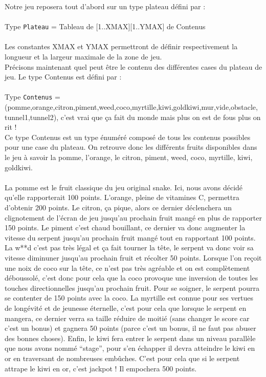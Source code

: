 \documentclass[11pt,a4paper]{article}
\begin{document}
        Notre jeu reposera tout d'abord sur un type plateau défini par : \\\\
        Type \verb|Plateau| = Tableau de [1..XMAX][1..YMAX] de Contenus\\\\
        Les constantes XMAX et YMAX permettront de définir respectivement la longueur et la largeur maximale de la zone de jeu.\\
        
        Précisons maintenant quel peut être le contenu des différentes cases du plateau de jeu. Le type Contenus est défini par : \\\\
        Type \verb|Contenus| = (pomme,orange,citron,piment,weed,coco,myrtille,kiwi,goldkiwi,mur,vide,obstacle,
        tunnel1,tunnel2), c'est vrai que ça fait du monde mais plus on est de fous plus on rit !\\
        
        Ce type Contenus est un type énuméré composé de tous les contenus possibles pour une case du plateau. On retrouve donc les différents fruits disponibles dans le jeu à savoir la pomme, l'orange, le citron, piment, weed, coco, myrtille, kiwi, goldkiwi.\\\\
        La pomme est le fruit classique du jeu original snake. Ici, nous avons décidé qu'elle rapporterait 100 points. L'orange, pleine de vitamines C, permettra d'obtenir 200 points. Le citron, ça pique, alors ce dernier déclenchera un clignotement  de l'écran de jeu jusqu'au prochain fruit mangé en plus de rapporter 150 points. Le piment c'est chaud bouillant, ce dernier va donc augmenter la vitesse du serpent jusqu'au prochain fruit mangé tout en rapportant 100 points. La w**d c'est pas très légal et ça fait tourner la tête, le serpent va donc voir sa vitesse diminuner jusqu'au prochain fruit et récolter 50 points. Lorsque l'on reçoit une noix de coco sur la tête, ce n'est pas très agréable et on est complètement déboussolé, c'est donc pour cela que la coco provoque une inversion de toutes les touches directionnelles jusqu'au prochain fruit. Pour se soigner, le serpent pourra se contenter de 150 points avec la coco. La myrtille est connue pour ses vertues de longévité et de jeunesse éternelle, c'est pour cela que lorsque le serpent en mangera, ce dernier verra sa taille réduire de moitié (sans changer le score car c'est un bonus) et gagnera 50 points (parce c'est un bonus, il ne faut pas abuser des bonnes choses). Enfin, le kiwi fera entrer le serpent dans un niveau parallèle que nous avons nommé ``stage'', pour s'en échapper il devra atteindre le kiwi en or en traversant de nombreuses embûches. C'est pour cela que si le serpent attrape le kiwi en or, c'est jackpot ! Il empochera 500 points.\\\\
        
\end{document}
